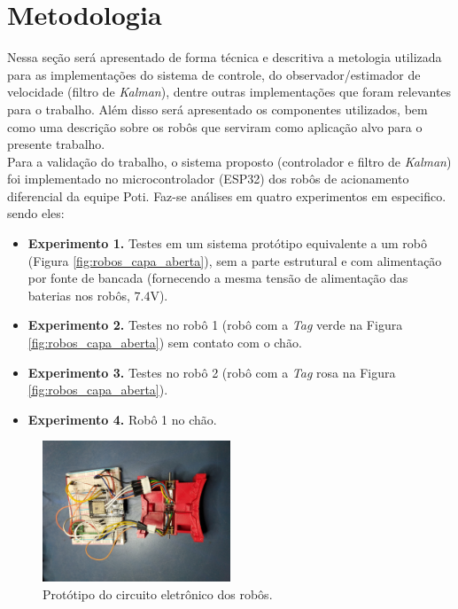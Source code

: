 \chapter[Metodologia]{Metodologia}
\label{ch:metodologia}

Nessa seção será apresentado de forma técnica e descritiva a metologia utilizada para as implementações do sistema de controle, do observador/estimador de velocidade (filtro de \emph{Kalman}), dentre outras implementações que foram relevantes para o trabalho. Além disso será apresentado os componentes utilizados, bem como uma descrição sobre os robôs que serviram como aplicação alvo para o presente trabalho.\\

Para a validação do trabalho, o sistema proposto (controlador e filtro de \emph{Kalman}) foi implementado no microcontrolador (ESP32) dos robôs de acionamento diferencial da equipe Poti. Faz-se análises em quatro experimentos em especifico. sendo eles:

\begin{itemize}
    \item \textbf{Experimento 1.} Testes em um sistema protótipo equivalente a um robô (Figura \ref{fig:robos_capa_aberta}), sem a parte estrutural e com alimentação por fonte de bancada (fornecendo a mesma tensão de alimentação das baterias nos robôs, $7.4$V).
    \item \textbf{Experimento 2.} Testes no robô 1 (robô com a \emph{Tag} verde na Figura \ref{fig:robos_capa_aberta}) sem contato com o chão.
    \item \textbf{Experimento 3.} Testes no robô 2 (robô com a \emph{Tag} rosa na Figura \ref{fig:robos_capa_aberta}).
    \item \textbf{Experimento 4.} Robô 1 no chão.
\end{itemize}

\begin{figure}[H]
    \centering
    \includegraphics[width=0.5\textwidth]{figuras/robo/protoboard.jpg}
    \caption{Protótipo do circuito eletrônico dos robôs.}
    \label{fig:prototipo}
\end{figure}

